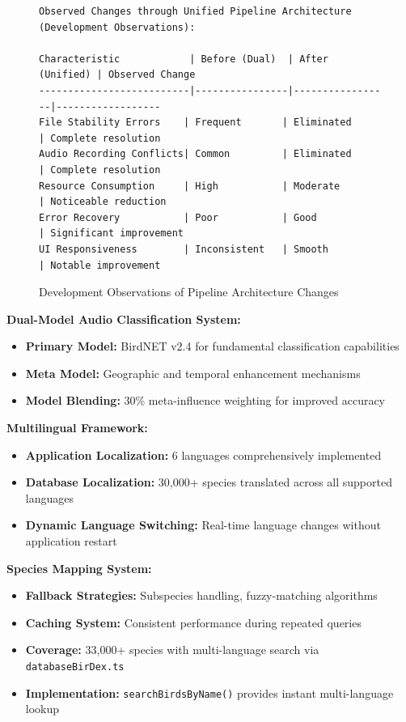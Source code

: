 \begin{figure}[H]
    \centering
    \begin{minipage}{0.8\textwidth}
        \footnotesize
        \begin{verbatim}
Observed Changes through Unified Pipeline Architecture (Development Observations):

Characteristic            | Before (Dual)  | After (Unified) | Observed Change
--------------------------|----------------|-----------------|------------------
File Stability Errors    | Frequent       | Eliminated      | Complete resolution
Audio Recording Conflicts| Common         | Eliminated      | Complete resolution
Resource Consumption     | High           | Moderate        | Noticeable reduction
Error Recovery           | Poor           | Good            | Significant improvement
UI Responsiveness        | Inconsistent   | Smooth          | Notable improvement
        \end{verbatim}
    \end{minipage}
    \caption{Development Observations of Pipeline Architecture Changes}
    \label{tab:pipeline_improvements}
\end{figure}

\textbf{Dual-Model Audio Classification System:}
\begin{itemize}
    \item \textbf{Primary Model:} BirdNET v2.4 for fundamental classification capabilities
    \item \textbf{Meta Model:} Geographic and temporal enhancement mechanisms
    \item \textbf{Model Blending:} 30\% meta-influence weighting for improved accuracy
\end{itemize}

\textbf{Multilingual Framework:}
\begin{itemize}
    \item \textbf{Application Localization:} 6 languages comprehensively implemented
    \item \textbf{Database Localization:} 30,000+ species translated across all supported languages
    \item \textbf{Dynamic Language Switching:} Real-time language changes without application restart
\end{itemize}

\textbf{Species Mapping System:}
\begin{itemize}
    \item \textbf{Fallback Strategies:} Subspecies handling, fuzzy-matching algorithms
    \item \textbf{Caching System:} Consistent performance during repeated queries
    \item \textbf{Coverage:} 33,000+ species with multi-language search via \texttt{databaseBirDex.ts}
    \item \textbf{Implementation:} \texttt{searchBirdsByName()} provides instant multi-language lookup
\end{itemize}

